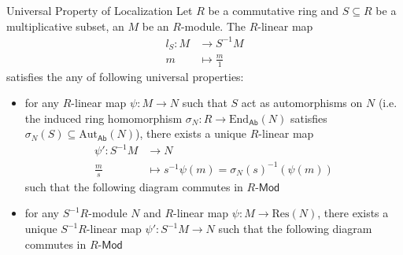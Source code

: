 \begin{proposition}{Universal Property of Localization}{}
    Let $R$ be a commutative ring and $S\subseteq R$ be a multiplicative subset, an $M$ be an $R$-module. The $R$-linear map
    \begin{align*}
        l_S:M&\longrightarrow S^{-1}M\\
         m&\longmapsto \frac{m}{1}
    \end{align*}
    satisfies the any of following universal properties: 
    \begin{itemize}
        \item for any $R$-linear map $\psi:M\to N$ such that $S$ act as automorphisms on $N$ (i.e. the induced ring homomorphism $\sigma_{N}:R\to\mathrm{End}_{\mathsf{Ab}}(N)$ satisfies $\sigma_{N}(S)\subseteq \mathrm{Aut}_{\mathsf{Ab}}(N)$), there exists a unique $R$-linear map
        \begin{align*}
            \psi':S^{-1}M&\longrightarrow N\\
            \frac{m}{s}&\longmapsto s^{-1}\psi(m)=\sigma_{N}(s)^{-1}(\psi(m))
        \end{align*}
        such that the following diagram commutes in $R\text{-}\mathsf{Mod}$
        \begin{center}
        \end{center}
        \item for any $S^{-1}R$-module $N$ and $R$-linear map $\psi:M\to \mathrm{Res}(N)$, there exists a unique $S^{-1}R$-linear map $\psi':S^{-1}M\to N$ such that the following diagram commutes in $R\text{-}\mathsf{Mod}$
        \begin{center}
        \end{center}
    \end{itemize}
    
    
\end{proposition}

